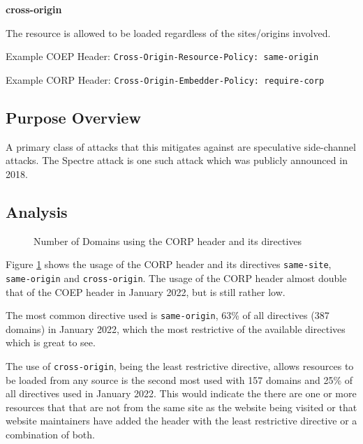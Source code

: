 \documentclass{mscreport}
\begin{document}
\vspace{0.7cm} \noindent
\textbf{cross-origin}

\vspace{0.3cm} \noindent
The resource is allowed to be loaded regardless of the sites/origins involved.

\vspace{0.3cm} \noindent
Example COEP Header: \texttt{Cross-Origin-Resource-Policy: same-origin}

\vspace{0.3cm} \noindent
Example CORP Header: \texttt{Cross-Origin-Embedder-Policy: require-corp}

\subsection{Purpose Overview}

\noindent
A primary class of attacks that this mitigates against are speculative side-channel attacks. The Spectre attack \cite{Kocher2019-gv} is one such attack which was publicly announced in 2018.

\clearpage
\newpage

\subsection{Analysis}

\begin{figure}[t]
	\begin{center}
		\caption{Number of Domains using the CORP header and its directives}
		\label{fig:corp_overview}
	\end{center}
\end{figure}

\noindent
Figure \ref{fig:corp_overview} shows the usage of the CORP header and its directives \texttt{same-site}, \texttt{same-origin} and \texttt{cross-origin}. The usage of the CORP header almost double that of the COEP header in January 2022, but is still rather low.

\vspace{0.3cm} \noindent
The most common directive used is \texttt{same-origin}, 63\% of all directives (387 domains) in January 2022, which the most restrictive of the available directives which is great to see.

\vspace{0.3cm} \noindent
The use of \texttt{cross-origin}, being the least restrictive directive, allows resources to be loaded from any source is the second most used with 157 domains and 25\% of all directives used in January 2022. This would indicate the there are one or more resources that that are not from the same site as the website being visited or that website maintainers have added the header with the least restrictive directive or a combination of both.
\end{document}
